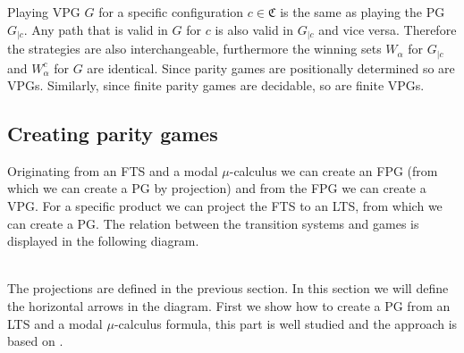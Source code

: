 \documentclass[]{article}
\begin{document}
Playing VPG $G$ for a specific configuration $c \in \mathfrak{C}$ is the same as playing the PG $G_{|c}$. Any path that is valid in $G$ for $c$ is also valid in $G_{|c}$ and vice versa. Therefore the strategies are also interchangeable, furthermore the winning sets $W_\alpha$ for $G_{|c}$ and $W_\alpha^c$ for $G$ are identical. Since parity games are positionally determined so are VPGs. Similarly, since finite parity games are decidable, so are finite VPGs.

\subsection{Creating parity games}
Originating from an FTS and a modal $\mu$-calculus we can create an FPG (from which we can create a PG by projection) and from the FPG we can create a VPG. For a specific product we can project the FTS to an LTS, from which we can create a PG. The relation between the transition systems and games is displayed in the following diagram.
\\\\
The projections are defined in the previous section. In this section we will define the horizontal arrows in the diagram. First we show how to create a PG from an LTS and a  modal $\mu$-calculus formula, this part is well studied and the approach is based on \cite{Bradfield2018}.
\end{document}
